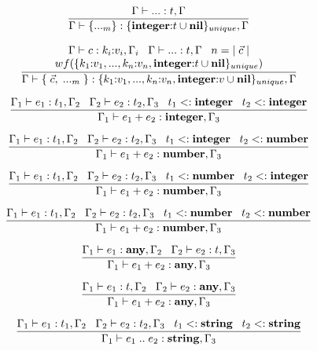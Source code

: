 \[
\dfrac{\Gamma \vdash {...}:t, \Gamma}
      {\Gamma \vdash \{{...}_{m}\}:\{\mathbf{integer}{:}t \cup \mathbf{nil}\}_{unique}, \Gamma}
\]

\[
\dfrac{\begin{array}{c}
       \Gamma \vdash c:k_{i}{:}v_{i}, \Gamma_{i} \;\;\;
       \Gamma \vdash {...}:t, \Gamma \;\;\;
       n = |\;\vec{c}\;| \\
       wf(\{k_{1}{:}v_{1}, ..., k_{n}{:}v_{n}, \mathbf{integer}{:}t \cup \mathbf{nil}\}_{unique})
       \end{array}}
      {\Gamma \vdash \{\;\vec{c},\;{...}_{m}\;\}:\{k_{1}{:}v_{1}, ..., k_{n}{:}v_{n}, \mathbf{integer}{:}v \cup \mathbf{nil}\}_{unique}, \Gamma}
\]

\[
\dfrac{\Gamma_{1} \vdash e_{1}:t_{1}, \Gamma_{2} \;\;\;
       \Gamma_{2} \vdash e_{2}:t_{2}, \Gamma_{3} \;\;\;
       t_{1} <: \mathbf{integer} \;\;\;
       t_{2} <: \mathbf{integer}}
      {\Gamma_{1} \vdash e_{1} + e_{2}:\mathbf{integer}, \Gamma_{3}}
\]

\[
\dfrac{\Gamma_{1} \vdash e_{1}:t_{1}, \Gamma_{2} \;\;\;
       \Gamma_{2} \vdash e_{2}:t_{2}, \Gamma_{3} \;\;\;
       t_{1} <: \mathbf{integer} \;\;\;
       t_{2} <: \mathbf{number}}
      {\Gamma_{1} \vdash e_{1} + e_{2}:\mathbf{number}, \Gamma_{3}}
\]

\[
\dfrac{\Gamma_{1} \vdash e_{1}:t_{1}, \Gamma_{2} \;\;\;
       \Gamma_{2} \vdash e_{2}:t_{2}, \Gamma_{3} \;\;\;
       t_{1} <: \mathbf{number} \;\;\;
       t_{2} <: \mathbf{integer}}
      {\Gamma_{1} \vdash e_{1} + e_{2}:\mathbf{number}, \Gamma_{3}}
\]

\[
\dfrac{\Gamma_{1} \vdash e_{1}:t_{1}, \Gamma_{2} \;\;\;
       \Gamma_{2} \vdash e_{2}:t_{2}, \Gamma_{3} \;\;\;
       t_{1} <: \mathbf{number} \;\;\;
       t_{2} <: \mathbf{number}}
      {\Gamma_{1} \vdash e_{1} + e_{2}:\mathbf{number}, \Gamma_{3}}
\]

\[
\dfrac{\Gamma_{1} \vdash e_{1}:\mathbf{any}, \Gamma_{2} \;\;\;
       \Gamma_{2} \vdash e_{2}:t, \Gamma_{3}}
      {\Gamma_{1} \vdash e_{1} + e_{2}:\mathbf{any}, \Gamma_{3}}
\]

\[
\dfrac{\Gamma_{1} \vdash e_{1}:t, \Gamma_{2} \;\;\;
       \Gamma_{2} \vdash e_{2}:\mathbf{any}, \Gamma_{3}}
      {\Gamma_{1} \vdash e_{1} + e_{2}:\mathbf{any}, \Gamma_{3}}
\]

\[
\dfrac{\Gamma_{1} \vdash e_{1}:t_{1}, \Gamma_{2} \;\;\;
       \Gamma_{2} \vdash e_{2}:t_{2}, \Gamma_{3} \;\;\;
       t_{1} <: \mathbf{string} \;\;\;
       t_{2} <: \mathbf{string}}
      {\Gamma_{1} \vdash e_{1} \; {..} \; e_{2}:\mathbf{string}, \Gamma_{3}}
\]

